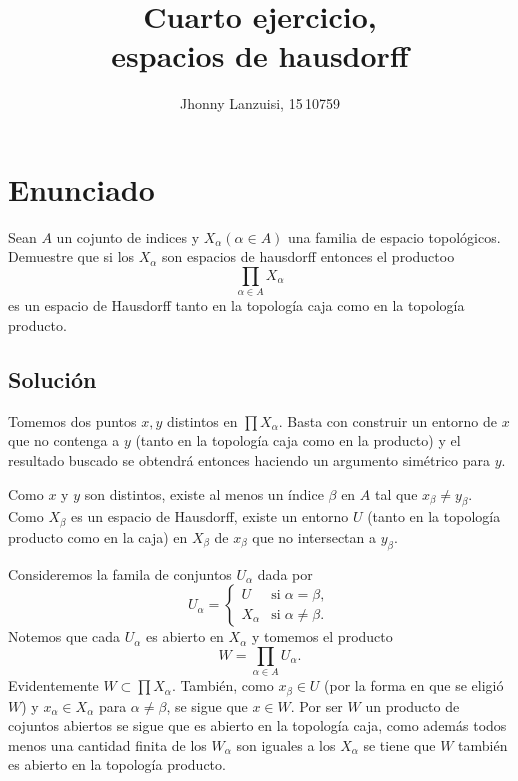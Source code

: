 \documentclass[fleqn,leqno,letterpaper,10pt,final]{article}
\title{Cuarto ejercicio,\\ espacios de hausdorff}
\author{Jhonny Lanzuisi, 15\,10759}
\begin{document}
\maketitle
\tableofcontents

\section[Enunciado]{Enunciado}
Sean $A$ un cojunto de indices y $X_{\alpha} (\alpha\in A)$ una familia de espacio topológicos.
Demuestre que si los $X_{\alpha}$ son espacios de hausdorff
entonces el productoo
\[
	\prod_{\alpha\in A} X_{\alpha}
\]
es un espacio de Hausdorff tanto en la topología caja como en la topología producto.

\subsection{Solución}
Tomemos dos puntos $x,y$ distintos en $\prod X_{\alpha}$. Basta con construir
un entorno de $x$ que no contenga a $y$ (tanto en la topología caja como en la producto)
y el resultado buscado se obtendrá entonces haciendo un argumento simétrico para $y$.

Como $x$ y $y$ son distintos,
existe al menos un índice $\beta$ en $A$ tal que $x_{\beta}\neq y_{\beta}$.
Como $X_{\beta}$ es un espacio de Hausdorff, existe  un entorno $U$
(tanto en la topología producto como en la caja)
 en $X_{\beta}$ de $x_{\beta}$ que no intersectan a $y_{\beta}$.

Consideremos la famila de conjuntos $U_\alpha$ dada por
\[
	U_{\alpha}=
		\begin{cases}
			U &\text{si}\;\alpha=\beta,\\
			X_\alpha &\text{si}\;\alpha\neq \beta.
		\end{cases}
\]
Notemos que cada $U_\alpha$ es abierto en $X_\alpha$ y tomemos el producto
\[
	W=\prod_{\alpha\in A} U_\alpha.
\]
Evidentemente $W\subset\prod X_{\alpha}$. También, como $x_{\beta}\in U$ 
(por la forma en que se eligió $W$) y $x_\alpha\in X_{\alpha}$ para
$\alpha\neq\beta$, se sigue que $x\in W$. Por ser $W$ un producto
de cojuntos abiertos se sigue que es abierto en la topología
caja, como además todos menos una cantidad finita de los 
$W_\alpha$ son iguales a los $X_\alpha$ se tiene que $W$ también
es abierto en la topología producto.
\end{document}
